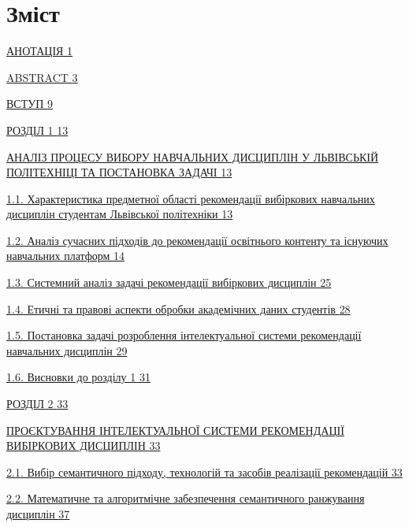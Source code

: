 \documentclass[
]{article}
\begin{document}
\emph{\hfill\break
}

\section{\texorpdfstring{\textbf{Зміст}}{Зміст}}\label{ux437ux43cux456ux441ux442}

\hyperref[_Toc230434074]{АНОТАЦІЯ \hyperref[_Toc230434074]{1}}

\hyperref[_Toc230434075]{ABSTRACT \hyperref[_Toc230434075]{3}}

\hyperref[_Toc230434076]{ВСТУП \hyperref[_Toc230434076]{9}}

\hyperref[_Toc230434077]{РОЗДІЛ 1 \hyperref[_Toc230434077]{13}}

\hyperref[_Toc230434078]{АНАЛІЗ ПРОЦЕСУ ВИБОРУ НАВЧАЛЬНИХ ДИСЦИПЛІН У
ЛЬВІВСЬКІЙ ПОЛІТЕХНІЦІ ТА ПОСТАНОВКА ЗАДАЧІ
\hyperref[_Toc230434078]{13}}

\hyperref[_Toc230434079]{1.1. Характеристика предметної області
рекомендації вибіркових навчальних дисциплін студентам Львівської
політехніки \hyperref[_Toc230434079]{13}}

\hyperref[_Toc230434080]{1.2. Аналіз сучасних підходів до рекомендації
освітнього контенту та існуючих навчальних платформ
\hyperref[_Toc230434080]{14}}

\hyperref[_Toc230434081]{1.3. Системний аналіз задачі рекомендації
вибіркових дисциплін \hyperref[_Toc230434081]{25}}

\hyperref[_Toc230434082]{1.4. Етичні та правові аспекти обробки
академічних даних студентів \hyperref[_Toc230434082]{28}}

\hyperref[_Toc230434083]{1.5. Постановка задачі розроблення
інтелектуальної системи рекомендації навчальних дисциплін
\hyperref[_Toc230434083]{29}}

\hyperref[_Toc230434084]{1.6. Висновки до розділу 1
\hyperref[_Toc230434084]{31}}

\hyperref[_Toc230434085]{РОЗДІЛ 2 \hyperref[_Toc230434085]{33}}

\hyperref[_Toc230434086]{ПРОЄКТУВАННЯ ІНТЕЛЕКТУАЛЬНОЇ СИСТЕМИ
РЕКОМЕНДАЦІЇ ВИБІРКОВИХ ДИСЦИПЛІН \hyperref[_Toc230434086]{33}}

\hyperref[_Toc230434087]{2.1. Вибір семантичного підходу, технологій та
засобів реалізації рекомендацій \hyperref[_Toc230434087]{33}}

\hyperref[_Toc230434088]{2.2. Математичне та алгоритмічне забезпечення
семантичного ранжування дисциплін \hyperref[_Toc230434088]{37}}
\end{document}

